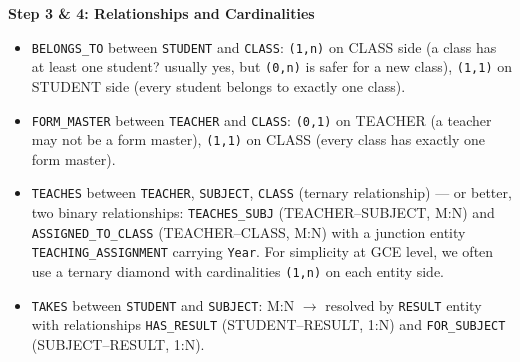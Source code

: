 \documentclass[11pt]{article}
\begin{document}
\textbf{Step 3 \& 4: Relationships and Cardinalities}
\begin{itemize}
    \item \texttt{BELONGS\_TO} between \texttt{STUDENT} and \texttt{CLASS}: \texttt{(1,n)} on CLASS side (a class has at least one student? usually yes, but \texttt{(0,n)} is safer for a new class), \texttt{(1,1)} on STUDENT side (every student belongs to exactly one class).
    \item \texttt{FORM\_MASTER} between \texttt{TEACHER} and \texttt{CLASS}: \texttt{(0,1)} on TEACHER (a teacher may not be a form master), \texttt{(1,1)} on CLASS (every class has exactly one form master).
    \item \texttt{TEACHES} between \texttt{TEACHER}, \texttt{SUBJECT}, \texttt{CLASS} (ternary relationship) — or better, two binary relationships: \texttt{TEACHES\_SUBJ} (TEACHER–SUBJECT, M:N) and \texttt{ASSIGNED\_TO\_CLASS} (TEACHER–CLASS, M:N) with a junction entity \texttt{TEACHING\_ASSIGNMENT} carrying \texttt{Year}. For simplicity at GCE level, we often use a ternary diamond with cardinalities \texttt{(1,n)} on each entity side.
    \item \texttt{TAKES} between \texttt{STUDENT} and \texttt{SUBJECT}: M:N $\to$ resolved by \texttt{RESULT} entity with relationships \texttt{HAS\_RESULT} (STUDENT–RESULT, 1:N) and \texttt{FOR\_SUBJECT} (SUBJECT–RESULT, 1:N).
\end{itemize}
\end{document}
